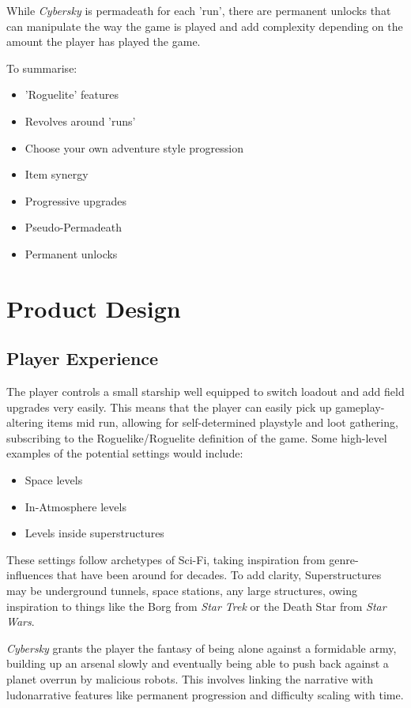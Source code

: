\documentclass{scrartcl}
\begin{document}
While \emph{Cybersky} is permadeath for each 'run', there are permanent unlocks that can manipulate the way the game is played and add complexity depending on the amount the player has played the game.

To summarise:

\begin{itemize}
  \item 'Roguelite' features
  \item Revolves around 'runs'
  \item Choose your own adventure style progression
  \item Item synergy
  \item Progressive upgrades
  \item Pseudo-Permadeath
  \item Permanent unlocks
\end{itemize}

\section{
  Product Design
 }

\subsection{Player Experience}

The player controls a small starship well equipped to switch loadout and add field upgrades very easily. This means that the player can easily pick up gameplay-altering items mid run, allowing for self-determined playstyle and loot gathering, subscribing to the Roguelike/Roguelite definition of the game. Some high-level examples of the potential settings would include:

\begin{itemize}
  \item Space levels
  \item In-Atmosphere levels
  \item Levels inside superstructures
\end{itemize}

These settings follow archetypes of Sci-Fi, taking inspiration from genre-influences that have been around for decades. To add clarity, Superstructures may be underground tunnels, space stations, any large structures, owing inspiration to things like the Borg from \emph{Star Trek} or the Death Star from \emph{Star Wars}.

\emph{Cybersky} grants the player the fantasy of being alone against a formidable army, building up an arsenal slowly and eventually being able to push back against a planet overrun by malicious robots. This involves linking the narrative with ludonarrative features like permanent progression and difficulty scaling with time.
\end{document}
